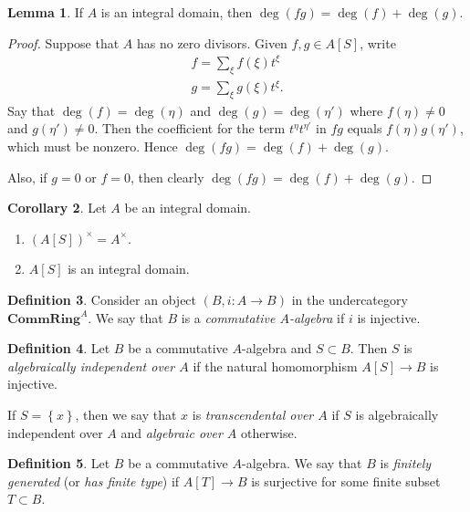 \documentclass[10pt,letterpaper,cm]{nupset}
\theoremstyle{definition}
\newtheorem{definition}{Definition}[subsection]
\theoremstyle{theorem}
\newtheorem{lemma}[definition]{Lemma}
\newtheorem{corollary}[definition]{Corollary}
\theoremstyle{remark}
\newcommand{\1}{\mathbf{1}}
\newcommand{\0}{\vec 0}
\begin{document}
\begin{lemma}
If $A$ is an integral domain, then $\deg(fg) = \deg(f) + \deg(g)$.
\end{lemma}
\begin{proof}
Suppose that $A$ has no zero divisors. Given $f,g \in A\left[S\right]$,  write 
\begin{gather*}
f= \sum_{\xi} f(\xi)t^{\xi}
\\  g= \sum_{\xi} g(\xi)t^{\xi}.
\end{gather*} Say that $\deg(f) = \deg(\eta)$ and $\deg(g) = \deg(\eta')$ where $f(\eta) \ne 0$ and $g(\eta') \ne 0$. Then the coefficient for the term $t^{\eta}t^{\eta'}$ in $fg$ equals $f(\eta)g(\eta')$, which must be nonzero. Hence $\deg(fg) = \deg(f) + \deg(g)$. 

Also, if $g=0$ or $f=0$, then clearly $\deg(fg) = \deg(f) + \deg(g)$.
\end{proof}

\begin{corollary}
Let $A$ be an integral domain. 
\begin{enumerate}
\item $\left(A\left[S\right]\right)^{\times} =A^{\times}$.
\item $A\left[S\right]$ is an integral domain.
\end{enumerate}
\end{corollary}

\medskip

\begin{definition}
Consider an object $\left(B, i : A \to B\right)$ in the undercategory $\mathbf{CommRing}^A$. We say that $B$ is a \textit{commutative $A$-algebra} if $i$ is injective. 
\end{definition}

\begin{definition}
Let $B$ be a commutative $A$-algebra and $S\subset B$. Then $S$ is \textit{algebraically independent over $A$} if the natural homomorphism $A\left[S\right] \to B$ is injective. 

If $S=\left\{x\right\}$, then we say that $x$ is \textit{transcendental over $A$} if $S$ is algebraically independent over $A$ and \textit{algebraic over $A$} otherwise.
\end{definition}

\begin{definition}
Let $B$ be a commutative $A$-algebra. We say that $B$ is \textit{finitely generated} (or \textit{has finite type}) if $A\left[T\right] \to B$ is surjective for some finite subset $T\subset B$.
\end{definition}
\end{document}
